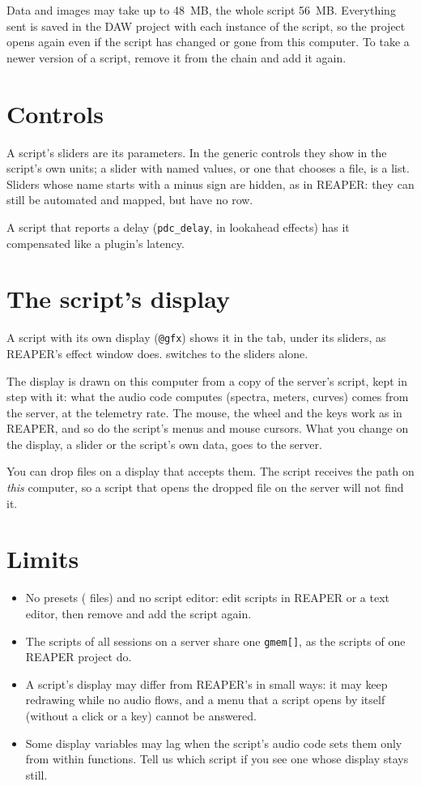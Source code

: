Data and images may take up to 48~MB, the whole script 56~MB. Everything
sent is saved in the DAW project with each instance of the script, so the
project opens again even if the script has changed or gone from this
computer. To take a newer version of a script, remove it from the chain and
add it again.

\section{Controls}

A script's sliders are its parameters. In the generic controls they show in
the script's own units; a slider with named values, or one that chooses a
file, is a list. Sliders whose name starts with a minus sign are hidden, as
in REAPER: they can still be automated and mapped, but have no row.

A script that reports a delay (\texttt{pdc\_delay}, in lookahead effects) has
it compensated like a plugin's latency.

\section{The script's display}

A script with its own display (\texttt{@gfx}) shows it in the
 tab, under its sliders, as REAPER's effect window does.
 switches to the sliders alone.

The display is drawn on this computer from a copy of the server's script,
kept in step with it: what the audio code computes (spectra, meters, curves)
comes from the server, at the telemetry rate. The mouse, the wheel and the
keys work as in REAPER, and so do the script's menus and mouse cursors.
What you change on the display, a slider or the script's own data, goes to
the server.

You can drop files on a display that accepts them. The script receives the
path on \emph{this} computer, so a script that opens the dropped file on the
server will not find it.

\section{Limits}

\begin{itemize}
  \item No presets ( files) and no script editor: edit scripts
    in REAPER or a text editor, then remove and add the script again.
  \item The scripts of all sessions on a server share one \texttt{gmem[]},
    as the scripts of one REAPER project do.
  \item A script's display may differ from REAPER's in small ways: it may
    keep redrawing while no audio flows, and a menu that a script opens by
    itself (without a click or a key) cannot be answered.
  \item Some display variables may lag when the script's audio code sets
    them only from within functions. Tell us which script if you see one
    whose display stays still.
\end{itemize}
